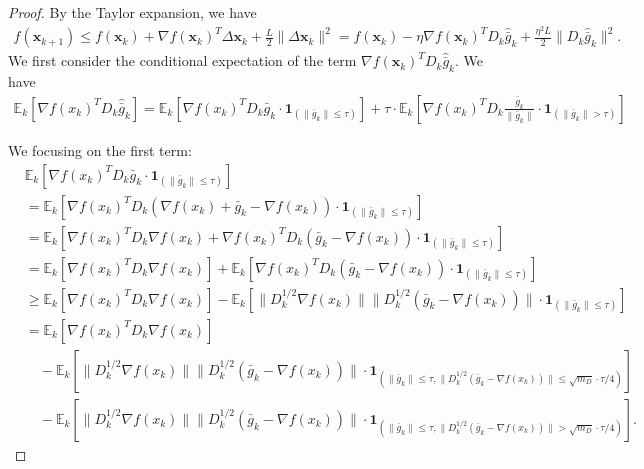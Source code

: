 \documentclass[10pt,a4paper]{amsart}
\newcommand{\barg}{\bar{g}}
\newcommand{\bx}{\boldsymbol{x}}
\begin{document}
\begin{proof}

By the Taylor expansion, we have
    \begin{align*}
    f(\bx_{k+1})  \le f(\bx_k) + \nabla f(\bx_k)^T \Delta \bx_k + \frac{L }{2} \|\Delta \bx_k\|^2  = f(\bx_k) - \eta  \nabla f(\bx_k)^T D_k\widehat{\barg}_k + \frac{\eta^2 L }{2} \|D_k\widehat{\barg}_k\|^2.
\end{align*}
We first consider the conditional expectation of the 
term $\nabla f(\bx_k)^T D_k\widehat{\barg}_k$. We have
\begin{align*}
\mathbb{E}_k\left[\nabla f(x_k)^T D_k \widehat{\barg}_k \right] = \mathbb{E}_k\left[\nabla f(x_k)^T D_k \bar{g}_k \cdot \boldsymbol{1}_{(\|\bar{g}_k\| \le \tau)}\right]  + \tau \cdot \mathbb{E}_k\left[\nabla f(x_k)^T D_k \frac{\bar{g}_k}{\|\bar{g}_k\|} \cdot \boldsymbol{1}_{(\|\bar{g}_k\| > \tau)} \right]
\end{align*}

We focusing on the first term:
\begin{align*}
& \mathbb{E}_k\left[\nabla f(x_k)^T D_k \bar{g}_k \cdot \boldsymbol{1}_{(\|\bar{g}_k\| \le \tau)}\right] \\
&= \mathbb{E}_k\left[\nabla f(x_k)^T D_k (\nabla f(x_k) + \bar{g}_k - \nabla f(x_k)) \cdot \boldsymbol{1}_{(\|\bar{g}_k\| \le \tau)} \right] \\
&= \mathbb{E}_k\left[\nabla f(x_k)^T D_k \nabla f(x_k) + \nabla f(x_k)^T D_k (\bar{g}_k - \nabla f(x_k)) \cdot \boldsymbol{1}_{(\|\bar{g}_k\| \le \tau)} \right]\\
& = \mathbb{E}_k\left[\nabla f(x_k)^T D_k \nabla f(x_k)\right] + \mathbb{E}_k\left[\nabla f(x_k)^T D_k (\bar{g}_k - \nabla f(x_k)) \cdot \boldsymbol{1}_{(\|\bar{g}_k\| \le \tau)}\right]\\
& \geq \mathbb{E}_k\left[\nabla f(x_k)^T D_k \nabla f(x_k)\right] - \mathbb{E}_k\left[\|D_k^{1/2}\nabla f(x_k)\| \|D_k^{1/2} (\bar{g}_k - \nabla f(x_k))\| \cdot \boldsymbol{1}_{(\|\bar{g}_k\| \le \tau)} \right]\\
& = \mathbb{E}_k\left[\nabla f(x_k)^T D_k \nabla f(x_k)\right] \\
& \quad - \mathbb{E}_k\left[\|D_k^{1/2}\nabla f(x_k)\| \|D_k^{1/2} (\bar{g}_k - \nabla f(x_k))\| \cdot \boldsymbol{1}_{(\|\bar{g}_k\| \le \tau,\|D_k^{1/2}(\bar{g}_k - \nabla f(x_k))\|\leq \sqrt{m_D}\cdot\tau/4)}\right]\\
& \quad - \mathbb{E}_k\left[\|D_k^{1/2}\nabla f(x_k)\| \|D_k^{1/2} (\bar{g}_k - \nabla f(x_k))\| \cdot \boldsymbol{1}_{(\|\bar{g}_k\| \le \tau,\|D_k^{1/2}(\bar{g}_k - \nabla f(x_k))\|> \sqrt{m_D}\cdot\tau/4)}\right] .
\end{align*}


\end{proof}
\end{document}
